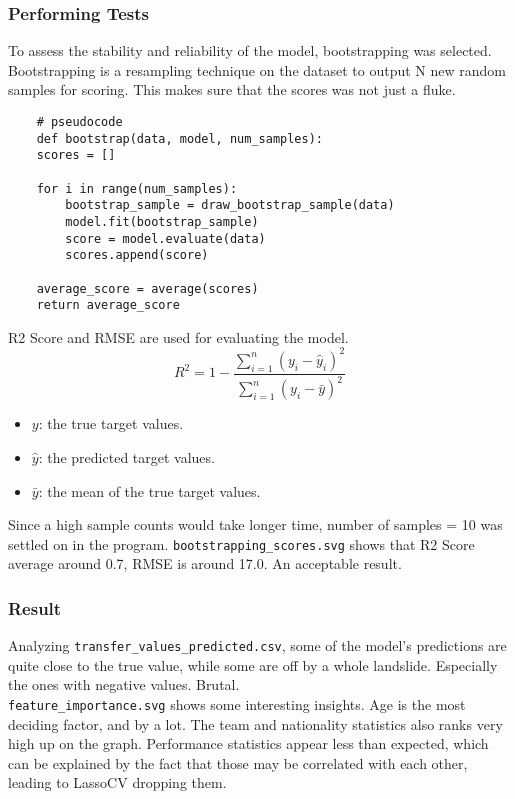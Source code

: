 \documentclass{report}
\begin{document}
\subsubsection{Performing Tests}
To assess the stability and reliability of the model, bootstrapping was selected. Bootstrapping is a 
resampling technique on the dataset to output N new random samples for scoring. This makes sure that 
the scores was not just a fluke. \\
\begin{verbatim}
    # pseudocode
    def bootstrap(data, model, num_samples):
    scores = []
    
    for i in range(num_samples):
        bootstrap_sample = draw_bootstrap_sample(data)
        model.fit(bootstrap_sample)
        score = model.evaluate(data)
        scores.append(score)
    
    average_score = average(scores)
    return average_score
\end{verbatim}

R2 Score and RMSE are used for evaluating the model.
\[ R^2 = 1 - \frac{\sum_{i=1}^{n} (y_i - \hat{y}_i)^2}{\sum_{i=1}^{n} (y_i - \bar{y})^2} \]
\begin{itemize}
    \item \( y \): the true target values.
    \item \( \hat{y} \): the predicted target values.
    \item \( \bar{y} \): the mean of the true target values.
\end{itemize}

Since a high sample counts would take longer time, number of samples = 10 was settled on in the program.
\verb|bootstrapping_scores.svg| shows that R2 Score average around 0.7, RMSE is around 17.0. An 
acceptable result.

\subsubsection{Result}
Analyzing \verb|transfer_values_predicted.csv|, some of the model's predictions are quite close to
the true value, while some are off by a whole landslide. Especially the ones with negative values. 
Brutal. \\
\verb|feature_importance.svg| shows some interesting insights. Age is the most deciding factor, and
by a lot. The team and nationality statistics also ranks very high up on the graph. Performance 
statistics appear less than expected, which can be explained by the fact that those may be correlated 
with each other, leading to LassoCV dropping them.
\end{document}
